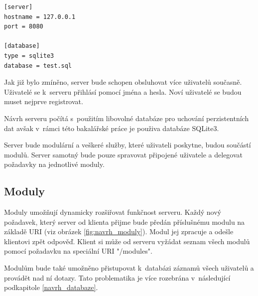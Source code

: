 \begin{verbatim}
[server]
hostname = 127.0.0.1
port = 8080

[database]
type = sqlite3
database = test.sql
\end{verbatim}
 
Jak již bylo zmíněno, server bude schopen obsluhovat více uživatelů současně.
Uživatelé se k~serveru přihlásí pomocí jména a hesla. Noví uživatelé se budou
muset nejprve registrovat.

Návrh serveru počítá s~použitím libovolné databáze pro uchování perzistentních dat avšak v~rámci této bakalářské
práce je použiva databáze SQLite3.

Server bude modulární a veškeré služby, které uživateli poskytne, budou součástí modulů. Server samotný bude pouze spravovat
připojené uživatele a delegovat požadavky na jednotlivé moduly.

\subsection{Moduly}
\label{navrh_moduly}

Moduly umožňují dynamicky rozšiřovat funkčnost serveru. Každý nový požadavek, který server od klienta přijme bude
předán příslušnému modulu na základě URI (viz obrázek \ref{fig:navrh_moduly}).
Modul jej zpracuje a odešle klientovi zpět odpověď. Klient si může
od serveru vyžádat seznam všech modulů pomocí požadavku na speciální URI "/modules".

Modulům bude také umožněno přistupovat k~databázi záznamů všech uživatelů a provádět nad ní dotazy. Tato problematika je více
rozebrána v~následující podkapitole \ref{navrh_databaze}.

